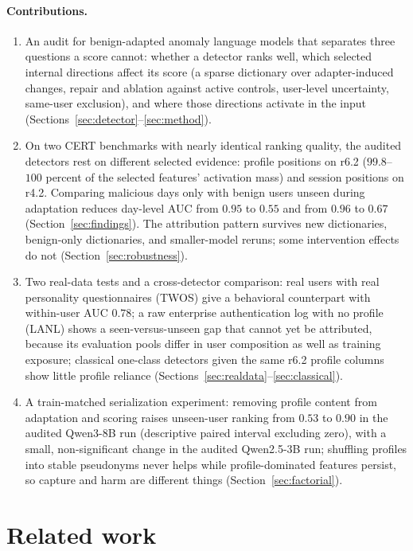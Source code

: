 \documentclass[10pt]{article} %
\begin{document}
\paragraph{Contributions.}
\begin{enumerate}[leftmargin=1.3em]
\item An audit for benign-adapted anomaly language models that separates
three questions a score cannot: whether a detector ranks well, which selected
internal directions affect its score (a sparse dictionary over
adapter-induced changes, repair and ablation against active controls,
user-level uncertainty, same-user exclusion), and where those directions
activate in the input (Sections~\ref{sec:detector}--\ref{sec:method}).
\item On two CERT benchmarks with nearly identical ranking quality, the
audited detectors rest on different selected evidence: profile positions on
r6.2 ($99.8$--$100$ percent of the selected features' activation mass) and
session positions on r4.2. Comparing malicious days only with benign users
unseen during adaptation reduces day-level AUC from $0.95$ to $0.55$ and from
$0.96$ to $0.67$ (Section~\ref{sec:findings}). The attribution pattern
survives new dictionaries, benign-only dictionaries, and smaller-model reruns;
some intervention effects do not (Section~\ref{sec:robustness}).
\item Two real-data tests and a cross-detector comparison: real users with
real personality questionnaires (TWOS) give a behavioral counterpart with
within-user AUC $0.78$; a raw enterprise authentication log with no profile
(LANL) shows a seen-versus-unseen gap that cannot yet be attributed,
because its evaluation pools differ in user composition as well as training
exposure; classical one-class detectors given the same
r6.2 profile columns show little profile reliance
(Sections~\ref{sec:realdata}--\ref{sec:classical}).
\item A train-matched serialization experiment: removing profile content from
adaptation and scoring raises unseen-user ranking from $0.53$ to $0.90$ in
the audited Qwen3-8B run (descriptive paired interval excluding zero), with a
small, non-significant change in the audited Qwen2.5-3B run; shuffling
profiles into stable pseudonyms never helps while profile-dominated features
persist, so capture and harm are different things
(Section~\ref{sec:factorial}).
\end{enumerate}

\section{Related work}
\label{sec:related}
\end{document}
